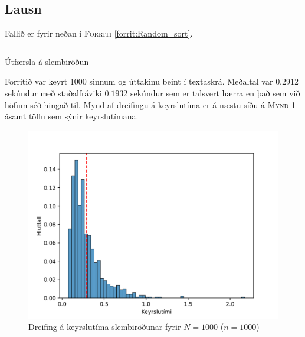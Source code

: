 \documentclass[12pt, a4paper, hidelinks]{article}
\begin{document}
\subsection*{Lausn}

Fallið er fyrir neðan í \textsc{Forriti} \ref{forrit:Random_sort}.

\begin{listing}[H]
    \centering
    \inputminted[linenos, frame=single, firstline=34, lastline=43]{java}{../src/V5/Random.java}
    \caption{Útfærsla á slembiröðun}
    \label{forrit:Random_sort}
\end{listing}

\noindent
Forritið var keyrt 1000 sinnum og úttakinu beint í textaskrá. Meðaltal var $0.2912$ sekúndur með staðalfráviki $0.1932$ sekúndur
sem er talsvert hærra en það sem við höfum séð hingað til. Mynd af dreifingu á keyrslutíma er á næstu síðu á \textsc{Mynd} \ref{mynd:Keyrslutimi_RandomSort}
ásamt töflu sem sýnir keyrslutímana.

\begin{figure}
    \centering
    \includegraphics[width=\textwidth]{img/RandomSort_1Kints.png}
    \caption{Dreifing á keyrslutíma slembiröðunar fyrir $N = 1000$ ($n = 1000$)}
    \label{mynd:Keyrslutimi_RandomSort}
\end{figure}



\newpage
\end{document}
